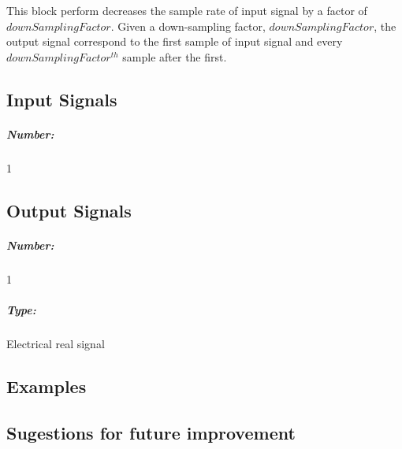 This block perform decreases the sample rate of input signal by a factor of $downSamplingFactor$. Given a down-sampling factor, $downSamplingFactor$, the output signal correspond to the first sample of input signal and every $downSamplingFactor^{th}$ sample after the first.


\pagebreak
\subsection*{Input Signals}

\subparagraph*{Number:} 1

\subsection*{Output Signals}

\subparagraph*{Number:} 1

\subparagraph*{Type:} Electrical real signal

\subsection*{Examples}

\subsection*{Sugestions for future improvement}


